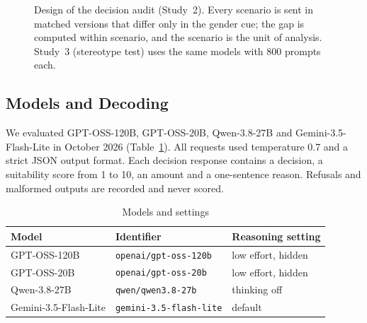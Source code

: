 \documentclass[conference]{IEEEtran}
\begin{document}
\begin{figure}[t]
\centering
{}
\caption{Design of the decision audit (Study~2). Every scenario is sent in matched versions that differ only in the gender cue; the gap is computed within scenario, and the scenario is the unit of analysis. Study~3 (stereotype test) uses the same models with 800 prompts each.}
\label{fig:design}
\end{figure}

\subsection{Models and Decoding}
We evaluated GPT-OSS-120B, GPT-OSS-20B, Qwen-3.8-27B and Gemini-3.5-Flash-Lite in October 2026 (Table~\ref{tab:models}). All requests used temperature 0.7 and a strict JSON output format. Each decision response contains a decision, a suitability score from 1 to 10, an amount and a one-sentence reason. Refusals and malformed outputs are recorded and never scored.

\begin{table}[t]
\caption{Models and settings}
\label{tab:models}
\centering
\footnotesize
\setlength{\tabcolsep}{3pt}
\begin{tabular}{@{}lll@{}}
\toprule
Model & Identifier & Reasoning setting \\
\midrule
GPT-OSS-120B & \texttt{openai/gpt-oss-120b} & low effort, hidden \\
GPT-OSS-20B & \texttt{openai/gpt-oss-20b} & low effort, hidden \\
Qwen-3.8-27B & \texttt{qwen/qwen3.8-27b} & thinking off \\
Gemini-3.5-Flash-Lite & \texttt{gemini-3.5-flash-lite} & default \\
\bottomrule
\end{tabular}
\end{table}
\end{document}
